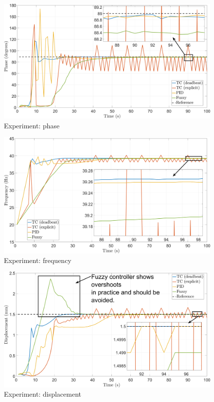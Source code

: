 \documentclass[preprint,12pt]{elsarticle}
\begin{document}
\begin{figure}
    \centering    \includegraphics[width=\linewidth]{F_phase.png}
    \caption{Experiment: phase}
    \label{F_phase}
\end{figure}

\begin{figure}
    \centering    \includegraphics[width=\linewidth]{F_frequency.png}
    \caption{Experiment: frequency}
    \label{F_frequency}
\end{figure}


\begin{figure}
    \centering    \includegraphics[width=\linewidth]{F_displacement.png}
    \caption{Experiment: displacement}
    \label{F_amplitude}
\end{figure}
\end{document}
